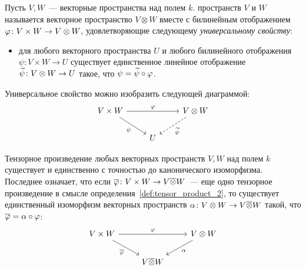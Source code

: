 
\begin{definition}\label{def:tensor_product_2}
Пусть $V,W$~--- векторные пространства над полем $k$. 
пространств $V$ и $W$ называется векторное пространство $V\otimes W$
вместе с билинейным отображением $\varphi\colon V\times W\to V\otimes W$,
удовлетворяющие следующему {\em универсальному свойству}:
\begin{itemize}
\item для любого векторного пространства $U$ и любого билинейного
  отображения $\psi\colon V\times W\to U$ существует единственное
  линейное отображение $\widetilde\psi\colon V\otimes W\to U$ такое, что
  $\psi = \widetilde\psi\circ\varphi$.
\end{itemize}
\end{definition}
Универсальное свойство можно изобразить следующей диаграммой:
$$
\begin{tikzcd}
V\times W\arrow{rr}{\ph}\arrow{rd}[swap]{\psi} &
& V\otimes W\arrow[dashed]{dl}{\tld\psi} \\
& U
\end{tikzcd}
$$
\begin{theorem}\label{thm:tensor_product}
Тензорное произведение любых векторных пространств $V,W$ над полем $k$
существует и единственно с точностью до канонического
изоморфизма. Последнее означает, что если $\overline{\varphi}\colon V\times W\to
V\overline\otimes W$~--- еще одно тензорное произведение в смысле
определения~\ref{def:tensor_product_2}, то существует единственный
изоморфизм векторных пространств $\alpha\colon V\otimes W\to
V\overline\otimes W$ такой, что $\overline{\varphi} = \alpha\circ\varphi$:
$$
\begin{tikzcd}
V\times W \arrow{rr}{\ph} \arrow{dr}[swap]{\ol\ph}
& & V\otimes W \arrow{dl}{\alpha} \\
& V\ol\otimes W
\end{tikzcd}
$$
\end{theorem}
